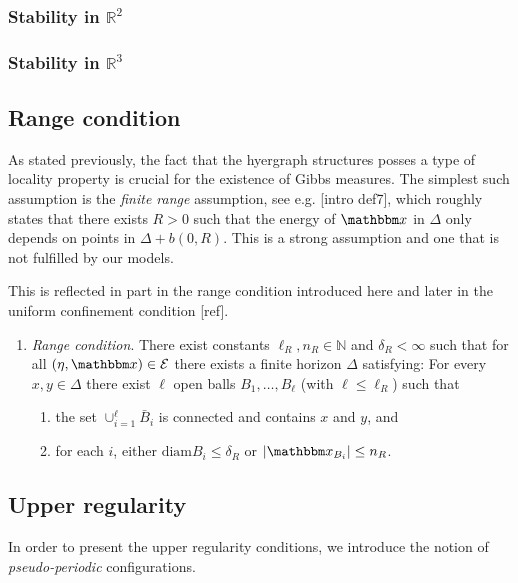 \subsubsection{Stability in $\mathbb R^2$}
\tbd
\subsubsection{Stability in $\mathbb R^3$}
\tbd
{}

\subsection{Range condition} \label{sec:range}
As stated previously, the fact that the hyergraph structures posses a type of locality property is crucial for the existence of Gibbs measures. The simplest such assumption is the \textit{finite range} assumption, see e.g. [intro def7], which roughly states that there exists $R>0$ such that the energy of $\x$ in $\Delta$ only depends on points in $\Delta + b(0,R)$. This is a strong assumption and one that is not fulfilled by our models. 

This is reflected in part in the range condition introduced here and later in the uniform confinement condition [ref].

\begin{enumerate}[\textbf{(R)}]
	\item \textit{Range condition}. There exist constants $\ell_R,n_R \in \mathbb N$ and $\delta_R < \infty$ such that for all $(\eta,\x) \in \mathcal E$ there exists a finite horizon $\Delta$ satisfying: For every $x,y \in \Delta$ there exist $\ell$ open balls $B_1, \dots, B_\ell$ (with $\ell \leq \ell_R$) such that
	\begin{enumerate}[-]
		\item the set $\cup^\ell_{i=1} \bar B_i$ is connected and contains $x$ and $y$, and 
		\item for each $i$, either $\text{diam} B_i \leq \delta_R$ or $|\x_{B_i}| \leq n_R$.
	\end{enumerate}
\end{enumerate}

\subsection{Upper regularity}


In order to present the upper regularity conditions, we introduce the notion of \textit{pseudo-periodic} configurations. 

